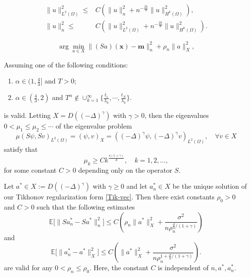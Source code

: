 \documentclass[10pt,a4paper]{amsart}
\begin{document}
\begin{equation}\label{esti-u<un}
\begin{aligned}
\| u \|^2_{L^2(\Omega)} \leq& C \left( \| u \|^2_n + n^{-\frac{2k}{d}} \| u \|^2_{H^k(\Omega)} \right),\\
\| u \|^2_n \leq& C \left( \| u \|^2_{L^2(\Omega)} + n^{-\frac{2k}{d}} \| u \|^2_{H^k(\Omega)} \right).
\end{aligned}
\end{equation}

\begin{equation}\label{Tik-vec}
\arg\min_{a \in X} \| (Sa)(\mathbf{x}) - \mathbf{m}\|_n^2 + \rho_n \| a \|^2_{X},
\end{equation}

\begin{lemma}\label{lem-eigen-H1}
Assuming one of the following conditions:
\begin{enumerate}[label = \roman*.]
    \item $\alpha\in (1,\frac43]$ and $T>0$;
    \item $\alpha\in(\frac43,2)$ and $T^\alpha \not\in \cup_{k=1}^\infty \{ \frac{t_1}{\lambda_k}, \cdots, \frac{t_N}{\lambda_k}\}$.
\end{enumerate}
is valid. Letting $X=D((-\Delta )^\gamma)$ with $\gamma>0$, then the eigenvalues  $  0 < \mu_1 \leq \mu_2 \leq \cdots  $  of the eigenvalue problem
\begin{equation}\label{eigen-S*S}
\mu (S\psi, Sv)_{L^2(\Omega)}=(\psi, v)_{X}=
((-\Delta)^{\gamma}\psi, (-\Delta)^{\gamma}v)_{L^2(\Omega)} ,\quad \forall v \in X
\end{equation}
satisfy that
$$
\mu_k \geq  C k^{\frac{4(1+\gamma)}d},\quad k = 1, 2, \ldots,
$$ for some constant  $  C >0 $  depending only on the operator $S$.
\end{lemma}

\begin{lemma}\label{lem-Ean-Ea*}
Let $a^*\in X:=D((-\Delta)^\gamma)$ with $\gamma\ge0$ and let $a_n^* \in X$ be the unique solution of our Tikhonov regularization form \eqref{Tik-vec}. Then there exist constants $ \rho_0 > 0 $ and $ C > 0 $ such that the following estimates
\[
\mathbb{E} \bigl[ \| S a_n^* - S a^* \|^2_n \bigr] \leq C \left( \rho_n \| a^* \|^2_X +  \frac{\sigma^2}{n \rho_n^{\frac{d}4/(1+\gamma)}} \right)
\]
and
\[
\mathbb{E} \bigl[ \| a_n^* - a^* \|^2_{X} \bigr] \leq C \left( \| a^* \|^2_X + \frac{\sigma^2}{n \rho_n^{1 + \frac{d}4/(1+\gamma)}}\right).
\]
are valid for any $0< \rho_n \leq \rho_0 $. Here, the constant $C$ is independent of $n,a^*,a_n^*$.
\end{lemma}
\end{document}
